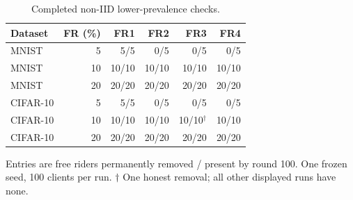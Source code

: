 \begin{table}[t]\centering\footnotesize\setlength{\tabcolsep}{3.5pt}
\caption{Completed non-IID lower-prevalence checks.}\label{tab:low-share}
\begin{tabular}{lrrrrr}\toprule
Dataset & FR (\%) & FR1 & FR2 & FR3 & FR4 \\ \midrule
MNIST & 5 & 5/5 & 0/5 & 0/5 & 0/5 \\
MNIST & 10 & 10/10 & 10/10 & 10/10 & 10/10 \\
MNIST & 20 & 20/20 & 20/20 & 20/20 & 20/20 \\
\midrule
CIFAR-10 & 5 & 5/5 & 0/5 & 0/5 & 0/5 \\
CIFAR-10 & 10 & 10/10 & 10/10 & 10/10$^{\dagger}$ & 10/10 \\
CIFAR-10 & 20 & 20/20 & 20/20 & 20/20 & 20/20 \\
\bottomrule\end{tabular}
\par\smallskip\parbox{\columnwidth}{\scriptsize Entries are free riders permanently removed / present by round 100. One frozen seed, 100 clients per run. $\dagger$ One honest removal; all other displayed runs have none.}
\end{table}
